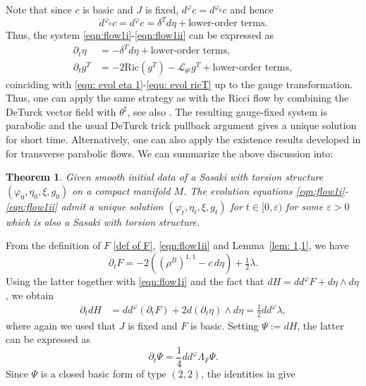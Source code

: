 \documentclass{article}
\newtheorem{thm}{Theorem}[section]
\theoremstyle{definition}
\renewcommand{\epsilon}{\varepsilon}
\renewcommand{\phi}{\varphi}
\numberwithin{equation}{section}
\begin{document}
Note that since $c$ is basic and $J$ is fixed, $d^\phi c= d^{\phi_0} c$ and hence
\[
d^{\phi_0} c
=d^\phi c=
\delta^Td\eta+\text{lower-order terms}.
\]
Thus, the system \eqref{eqn:flow1i}-\eqref{eqn:flow1ii} can be expressed as
\[
\begin{split}
\partial_t\eta
&=
-\delta^Td\eta+\text{lower-order terms},\\
\partial_tg^T
&=
-2\mathrm{Ric}(g^T)
-\mathcal L_{\theta^\sharp}g^T
+\text{lower-order terms},
\end{split}
\]
coinciding with \eqref{equ: evol eta 1}-\eqref{equ: evol ricT} up to the gauge transformation.
Thus, one can apply the same strategy as with the Ricci flow by combining the DeTurck vector field with $\theta^\sharp$, see also \cite{fadelflows2}. The resulting gauge-fixed system is parabolic and the usual DeTurck trick pullback argument gives a unique
solution for short time. Alternatively, one can also apply the existence results developed in \cite{Bedulli2018} for transverse parabolic flows. We can summarize the above discussion into:  
\begin{thm}\label{thm:ST-flow}
Given smooth initial data of a Sasaki with torsion structure  $(\phi_0,\eta_0,\xi,g_0)$ on a compact manifold $M$. The evolution equations \eqref{eqn:flow1i}-\eqref{eqn:flow1ii} admit a unique solution $(\phi_t,\eta_t,\xi,g_t)$ for $t\in[0,\epsilon)$ for some $\epsilon>0$ 
which is also a Sasaki with torsion structure.
\end{thm} 
From the definition of $F$ \eqref{def of F}, \eqref{eqn:flow1ii} and  Lemma~\ref{lem: 1,1}, we have
\[
\partial_tF
=
-2\left((\rho^B)^{1,1}-c\,d\eta\right)+\tfrac12 \lambda.
\]
Using the latter together with  \eqref{eqn:flow1i} and the fact that
$dH=dd^\phi F+d\eta\wedge d\eta$, we obtain
\begin{align*}
\partial_t dH &=
dd^\phi(\partial_tF)
+
2d(\partial_t\eta)\wedge d\eta= \tfrac12 dd^\phi \lambda,
\end{align*}
where again we used that $J$ is fixed and $F$ is basic. 
Setting $\Psi:=dH$, the latter can be expressed as
\[
\partial_t\Psi
=
\frac14dd^\phi\Lambda_F\Psi.
\]
Since $\Psi$ is a closed basic form of type $(2,2)$, the identities in
\cite[Theorem~1.1]{Demailly} give
\end{document}
